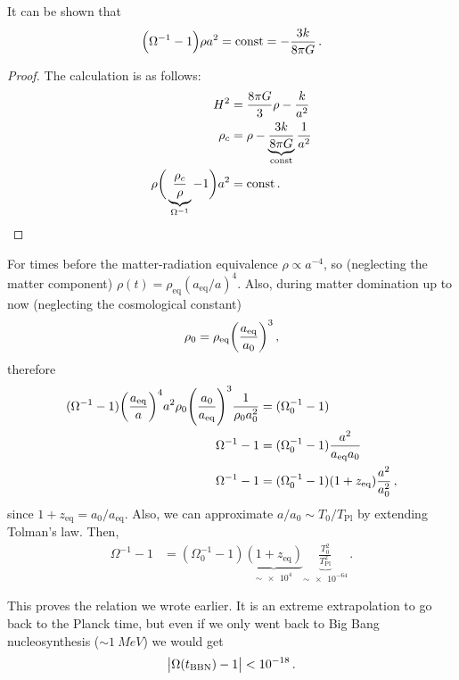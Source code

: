\documentclass[main.tex]{subfiles}
\begin{document}
\begin{claim}
It can be shown that 
%
\begin{align}
\qty(\Omega^{-1} - 1) \rho a^2 = \text{const} = -\frac{3k}{8 \pi G}
\,.
\end{align}
\end{claim}
\begin{proof}
The calculation is as follows: 
%
\begin{align}
H^2 &= \frac{8 \pi G}{3} \rho - \frac{k}{a^2}  \\
\rho _c &= \rho - \underbrace{\frac{3 k}{8 \pi G}}_{\text{const}} \frac{1}{a^2}  \\
\rho \bigg( \underbrace{\frac{\rho _c}{\rho }}_{\Omega^{-1}} - 1\bigg) a^2 &= \text{const}
\,.
\end{align}

\end{proof}

For times before the matter-radiation equivalence \(\rho \propto a^{-4}\), so (neglecting the matter component) \(\rho (t) = \rho _{\text{eq}} (a _{\text{eq}} / a)^{4}\). Also, during matter domination up to now (neglecting the cosmological constant)
%
\begin{align}
\rho_0 = \rho _{\text{eq}} \qty(\frac{a _{\text{eq}}}{a_0 })^3
\,,
\end{align}
%
therefore 
%
\begin{align}
(\Omega^{-1} -1) \qty(\frac{a _{\text{eq}}}{a})^{4} a^2 \rho_0 \qty(\frac{a_0 }{a _{\text{eq}}})^{3} \frac{1}{\rho_0 a_0^2} &= (\Omega_0^{-1} - 1)
\\
\Omega^{-1} - 1 &= (\Omega_0^{-1} -1) \frac{a^2}{a _{\text{eq}} a_0 } \\
\Omega^{-1} - 1 &= (\Omega_0^{-1} -1) (1 + z _{\text{eq}}) \frac{a^2}{a_0^2}
\,,
\end{align}
%
since \(1 + z _{\text{eq}} = a_0 / a _{\text{eq}}\). Also, we can approximate \(a/a_0 \sim T_0 / T _{\text{Pl}}\) by extending Tolman's law. 
Then, 
%
\begin{align}
\Omega^{-1} - 1 &= (\Omega_0^{-1} -1) \underbrace{(1 + z _{\text{eq}})}_{\sim \num{e4}} \underbrace{\frac{T_0 ^2}{T _{\text{Pl}}^2}}_{\sim \num{e-64}}
\,.
\end{align}

This proves the relation we wrote earlier. It is an extreme extrapolation to go back to the Planck time, but even if we only went back to Big Bang nucleosynthesis (\(\sim \SI{1}{MeV}\)) we would get 
%
\begin{align}
\abs{\Omega (t _{\text{BBN}}) - 1 } < \num{e-18}
\,.
\end{align}
\end{document}
